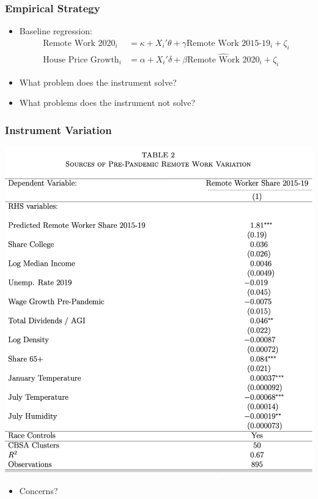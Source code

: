 \documentclass[english,xcolor=svgnames]{beamer}
\begin{document}
\begin{frame}
	\frametitle[alignment=center]{Empirical Strategy}
	\begin{itemize}
		\item Baseline regression:
		\begin{align*}
			\text{Remote Work 2020}_i &= \kappa + X_i'\theta + \gamma \text{Remote Work 2015-19}_i + \zeta_i \\
			\text{House Price Growth}_i &= \alpha + X_i'\delta + \beta \widehat{\text{Remote Work 2020}}_i + \zeta_i 
		\end{align*}
		\item What problem does the instrument solve?
		\item What problems does the instrument not solve?
	\end{itemize}
\end{frame}

\begin{frame}
	\frametitle[alignment=center]{Instrument Variation}
	\begin{center}
		\includegraphics[scale=0.3]{figures/MWTAB2.png}
	\end{center}
	\begin{itemize}
		\item Concerns?
	\end{itemize}
\end{frame}
\end{document}
